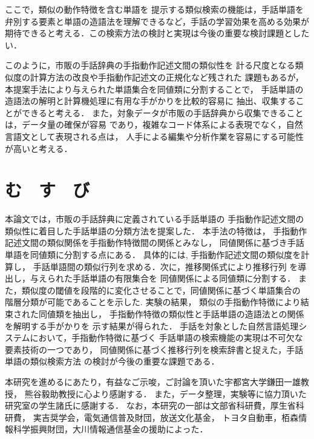 ここで，類似の動作特徴を含む単語を
提示する類似検索の機能は，手話単語を弁別する要素と単語の造語法を理解できるなど，手話の学習効果を高める効果が期待できると考える．この検索方法の検討と実現は今後の重要な検討課題としたい．

このように，市販の手話辞典の手指動作記述文間の類似性を
計る尺度となる類似度の計算方法の改良や手指動作記述文の正規化など残された
課題もあるが，本提案手法により与えられた単語集合を同値類に分割することで，
手話単語の造語法の解明と計算機処理に有用な手がかりを比較的容易に
抽出、収集することができると考える．
また，対象データが市販の手話辞典から収集できることは，データ量の確保が容易
であり，複雑なコード体系による表現でなく，自然言語文として表現される点は，
人手による編集や分析作業を容易にする可能性が高いと考える．

\section{む　す　び}

本論文では，市販の手話辞典に定義されている手話単語の
手指動作記述文間の類似性に着目した手話単語の分類方法を提案した．
本手法の特徴は，
手指動作記述文間の類似関係を手指動作特徴間の関係とみなし，
同値関係に基づき手話単語を同値類に分割する点にある．
具体的には,
手指動作記述文間の類似度を計算し，
手話単語間の類似行列を求める．次に，推移関係式により推移行列
を導出し，与えられた手話単語の有限集合を
同値関係による同値類に分割する．
また，類似度の閾値を段階的に変化させることで，同値関係に基づく単語集合の
階層分類が可能であることを示した.
実験の結果，
類似の手指動作特徴により結束された同値類を抽出し，
手指動作特徴の類似性と手話単語の造語法との関係を解明する手がかりを
示す結果が得られた．
手話を対象とした自然言語処理システムにおいて，手指動作特徴に基づく
手話単語の検索機能の実現は不可欠な要素技術の一つであり，
同値関係に基づく推移行列を検索辞書と捉えた，手話単語の類似検索方法
の検討が今後の重要な課題である．

\acknowledgment

本研究を進めるにあたり，有益なご示唆，ご討論を頂いた宇都宮大学鎌田一雄教授，
熊谷毅助教授に心より感謝する．
また，データ整理，実験等に協力頂いた研究室の学生諸氏に感謝する．
なお，本研究の一部は文部省科研費，厚生省科研費，
実吉奨学会，電気通信普及財団，放送文化基金，
トヨタ自動車，栢森情報科学振興財団，大川情報通信基金の援助によった．






\begin{biography}


\end{biography}



